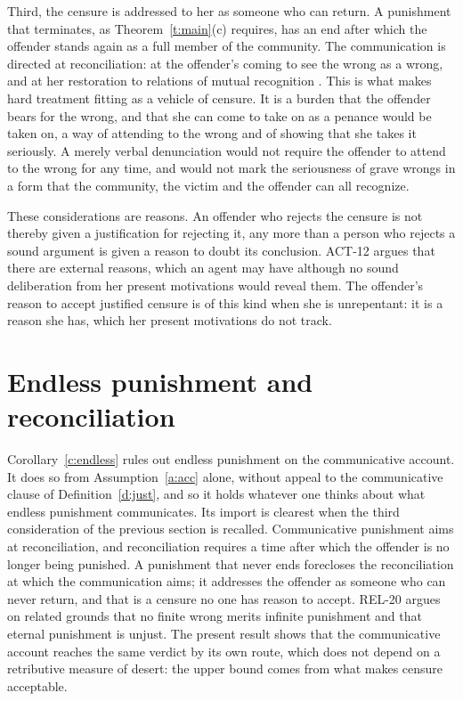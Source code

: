 \documentclass{situationist-preprint}
\begin{document}
Third, the censure is addressed to her as someone who can return. A punishment that terminates, as Theorem~\ref{t:main}(c) requires, has an end after which the offender stands again as a full member of the community. The communication is directed at reconciliation: at the offender's coming to see the wrong as a wrong, and at her restoration to relations of mutual recognition \citep{Duff2001,Bennett2008}. This is what makes hard treatment fitting as a vehicle of censure. It is a burden that the offender bears for the wrong, and that she can come to take on as a penance would be taken on, a way of attending to the wrong and of showing that she takes it seriously. A merely verbal denunciation would not require the offender to attend to the wrong for any time, and would not mark the seriousness of grave wrongs in a form that the community, the victim and the offender can all recognize.

These considerations are reasons. An offender who rejects the censure is not thereby given a justification for rejecting it, any more than a person who rejects a sound argument is given a reason to doubt its conclusion. ACT-12 argues that there are external reasons, which an agent may have although no sound deliberation from her present motivations would reveal them. The offender's reason to accept justified censure is of this kind when she is unrepentant: it is a reason she has, which her present motivations do not track.

\section{Endless punishment and reconciliation}

Corollary~\ref{c:endless} rules out endless punishment on the communicative account. It does so from Assumption~\ref{a:acc} alone, without appeal to the communicative clause of Definition~\ref{d:just}, and so it holds whatever one thinks about what endless punishment communicates. Its import is clearest when the third consideration of the previous section is recalled. Communicative punishment aims at reconciliation, and reconciliation requires a time after which the offender is no longer being punished. A punishment that never ends forecloses the reconciliation at which the communication aims; it addresses the offender as someone who can never return, and that is a censure no one has reason to accept. REL-20 argues on related grounds that no finite wrong merits infinite punishment and that eternal punishment is unjust. The present result shows that the communicative account reaches the same verdict by its own route, which does not depend on a retributive measure of desert: the upper bound comes from what makes censure acceptable.
\end{document}
